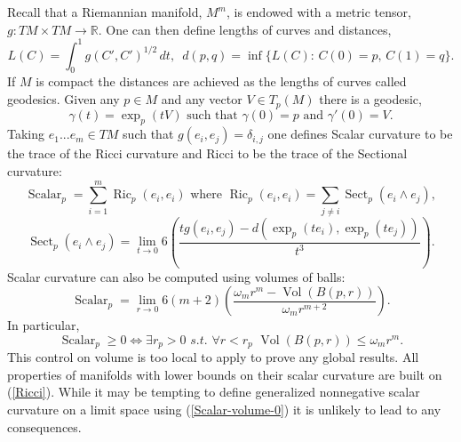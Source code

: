 \documentclass[12pt]{amsart}
\begin{document}
Recall that a Riemannian manifold, $M^m$, is endowed with a metric tensor,
$g: TM\times TM\to \mathbb{R}$.   One can then define lengths of curves
and distances, 
\begin{equation}
L(C)=\int_0^1 g(C', C')^{1/2} \, dt,
\,\,\,
d(p,q) = \inf\{ L(C): \, C(0)=p,\, C(1)=q\}.
\end{equation}
If $M$ is compact the distances are achieved as the lengths of
curves called geodesics.   Given any $p\in M$ and any 
vector $V\in T_p(M)$ there is a geodesic,  
\begin{equation} \label{geod-start}
\gamma(t)=\exp_p(tV)
\textrm{ such that } \gamma(0)=p \textrm{ and } \gamma'(0)=V.
\end{equation}
Taking $e_1...e_m\in TM$ such that  $g(e_i, e_j) =\delta_{i,j}$
one defines Scalar curvature to be the trace of the Ricci curvature
and Ricci to be the trace of the Sectional curvature:
\begin{equation} \label{Ricci}
{\operatorname{Scalar}}_p= \sum_{i=1}^m {\operatorname{Ric}}_p(e_i, e_i) \textrm{ where }
{\operatorname{Ric}}_p(e_i,e_i)= \sum_{j\neq i} {\operatorname{Sect}}_p(e_i \wedge e_j), 
\end{equation}
\begin{equation} \label{Sect}
{\operatorname{Sect}}_p(e_i \wedge e_j)= \lim_{t\to 0}  
6 \left(\frac{tg(e_i,e_j)-d(\exp_p(te_i), \exp_p(te_j))}{t^3}\right).
\end{equation}
Scalar curvature can also be computed using volumes of balls:
\begin{equation} \label{Scalar-volume}
{\operatorname{Scalar}}_p= \lim_{r\to 0} 6(m+2) 
\left(\frac{\omega_mr^m-{\operatorname{Vol}}(B(p,r))}{\omega_m r^{m+2}}\right).
\end{equation}
In particular,
\begin{equation}\label{Scalar-volume-0}
{\operatorname{Scalar}}_p \ge 0 \iff  \exists r_p>0 \,\,s.t. \,\, \forall r<r_p\,\, {\operatorname{Vol}}(B(p,r)) \le \omega_m r^m. 
\end{equation}
This control on volume is too local to apply to prove any global results.  
All properties of manifolds with lower bounds on their
scalar curvature are built on (\ref{Ricci}).   While it may be tempting to
define generalized nonnegative scalar curvature on a limit space using
(\ref{Scalar-volume-0}) it is unlikely to lead to any consequences.
\end{document}
